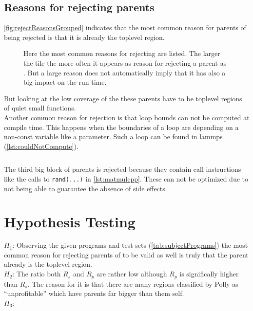 \subsection{Reasons for rejecting parents}
\autoref{fig:rejectReasonsGrouped} indicates that the most common reason for parents of \scops being rejected is that it is already the toplevel region.
\begin{figure}[h]
    \caption[Reasons for rejecting SCoPs]{
        Here the most common reasons for rejecting are listed.
        The larger the tile the more often it appears as reason for rejecting a parent as \scop.
        But a large reason does not automatically imply that it has also a big impact on the run time.
    }
    
    \label{fig:rejectReasonsGrouped}
\end{figure}
But looking at the low coverage of the \scops these parents have to be toplevel regions of quiet small functions.\\
Another common reason for rejection is that loop bounds can not be computed at compile time.
This happens \eg when the boundaries of a loop are depending on a non-const variable like a parameter.
Such a loop can be found in lammps (\autoref{lst:couldNotCompute}).
\begin{code}
    \caption{An example for 'loop bound could not be computed'}
    \inputminted{c}{c/nonAffineLoopBoundCouldNotCompute.c}
    \label{lst:couldNotCompute}
\end{code}
The third big block of parents is rejected because they contain call instructions like the calls to \texttt{rand(...)} in \autoref{lst:matmulcpp}.
These can not be optimized due to not being able to guarantee the absence of side effects.\\
\section{Hypothesis Testing}
\(H_1\): Observing the given programs and test sets (\autoref{tab:subjectPrograms}) the most common reason for rejecting parents of \scop to be valid as well is truly that the parent already is the toplevel region.\\
\(H_2\): The ratio both \(R_s\) and \(R_p\) are rather low although \(R_p\) is significally higher than \(R_s\).
The reason for it is that there are many regions classified by Polly as \enquote{unprofitable} which have parents far bigger than them self.\\
\(H_3\): \\
